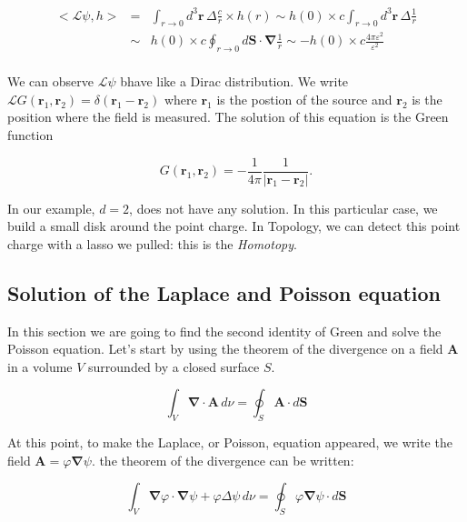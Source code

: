 \documentclass[final, paper=letter,5p,times,twocolumn]{elsarticle}
\theoremstyle{definition}
\begin{document}
{\begin{equation}
  \begin{array}{rcl}
    <\mathcal{L} \psi, h > & = & \int_{r\rightarrow 0} d^{3}\bm{r} \, \Delta \frac{c}{r} \times h(r) \sim h(0)  \times c \int_{r\rightarrow 0} d^{3}\bm{r} \, \Delta \frac{1}{r} \\
    & \sim &  h(0)  \times c \oint_{r\rightarrow 0} d\bm{S} \cdot \bm{\nabla} \frac{1}{r} \sim - h(0)  \times c \frac{4\pi\varepsilon^{2}}{\varepsilon^{2}} \\
  \end{array}
\end{equation}

We can observe $\mathcal{L} \psi$ bhave like a Dirac distribution. We write $\mathcal{L} G(\bm{r}_{1}, \bm{r}_{2}) = \delta(\bm{r}_{1} - \bm{r}_{2})$ where $\bm{r}_{1}$ is the postion of the source and $ \bm{r}_{2}$ is the position where the field is measured. The solution of this equation is the Green function


\begin{equation}
G(\bm{r}_{1}, \bm{r}_{2}) = -\frac{1}{4\pi}\frac{1}{|\bm{r}_{1} - \bm{r}_{2}|}.
\label{eq:Green_Function_laplace}
\end{equation}


In our example, $d=2$, does not have any solution. In this particular case, we build a small disk around the point charge. In Topology, we can detect this point charge with a lasso we pulled: this is the {\it Homotopy}.\\


\subsection{Solution of the Laplace and Poisson equation}

In this section we are going to find the second identity of Green and solve the Poisson equation. Let's start by using the theorem of the divergence on a field $\bm{A}$ in a volume $V$ surrounded by a closed surface $S$.

$$
\int_{V} \bm{\nabla} \cdot \bm{A} \, d\nu = \oint_{S} \bm{A} \cdot d\bm{S}
$$

At this point, to make the Laplace, or Poisson, equation appeared, we write the field $\bm{A} = \varphi \bm{\nabla} \psi$. the theorem of the divergence can be written:

$$
\int_{V} \bm{\nabla}\varphi \cdot \bm{\nabla} \psi + \varphi \Delta \psi\, d\nu = \oint_{S}\varphi \bm{\nabla} \psi \cdot d\bm{S}
$$

}
\end{document}
